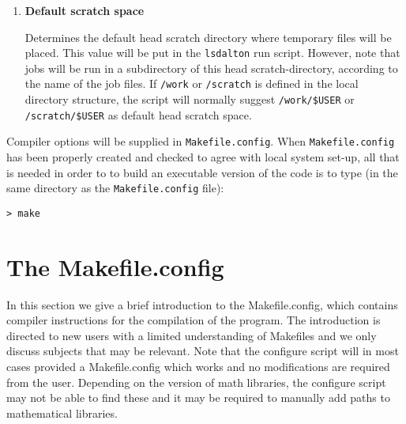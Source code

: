 \begin{enumerate}
\item {\bf Default scratch space}

Determines the default head scratch
directory where temporary files will be placed. This value will be put
in the \verb|lsdalton| run script. However, note that jobs will be run in
a subdirectory of this head scratch-directory, according to the name
of the job files. If \verb|/work| or \verb|/scratch| is defined in the
local directory structure, the script will normally suggest
\verb|/work/$USER| or \verb|/scratch/$USER| as default head scratch space.

\end{enumerate}

Compiler options will be supplied in \verb|Makefile.config|.
When  \verb|Makefile.config| has been properly
created and checked
to agree with local system set-up, all that is needed in order to
to build an executable version of the
code is to type
(in the same directory as the \verb|Makefile.config| file):
\begin{verbatim}
> make
\end{verbatim}

\section{The Makefile.config}\label{sec:makefileconfig}

In this section we give a brief introduction to the Makefile.config, which contains compiler instructions for the compilation of the program. 
The introduction is directed to new users with a limited understanding of Makefiles and we only discuss subjects that may be relevant. 
Note that the configure script will in most cases provided a Makefile.config which works and no modifications are required from the user. 
Depending on the version of math libraries, the configure script may not be able to find these and it may be required to manually 
add paths to mathematical libraries. 

